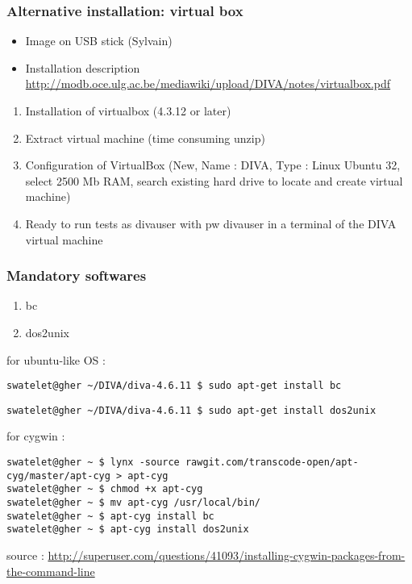 \begin{frame}
\frametitle{Alternative installation: virtual box}
\begin{itemize}
\item Image  on USB stick (Sylvain)
\item Installation description \url{http://modb.oce.ulg.ac.be/mediawiki/upload/DIVA/notes/virtualbox.pdf}
\end{itemize}

\begin{enumerate}
\item Installation of virtualbox (4.3.12 or later)
\item Extract virtual machine  (time consuming unzip)
\item Configuration of VirtualBox (New, Name : DIVA, Type : Linux Ubuntu 32, select 2500 Mb RAM, search existing hard drive to locate  and create virtual machine)
\item Ready to run tests as divauser with pw divauser in a terminal of the DIVA virtual machine
\end{enumerate}



\end{frame}
\begin{frame}[fragile]
\frametitle{Mandatory softwares}

\begin{enumerate}
\item bc
\item dos2unix
\end{enumerate}

for ubuntu-like OS :

\begin{lstlisting}[style=Bash]
swatelet@gher ~/DIVA/diva-4.6.11 $ sudo apt-get install bc
\end{lstlisting}

\begin{lstlisting}[style=Bash]
swatelet@gher ~/DIVA/diva-4.6.11 $ sudo apt-get install dos2unix
\end{lstlisting}

for cygwin :

\begin{lstlisting}[style=Bash]
swatelet@gher ~ $ lynx -source rawgit.com/transcode-open/apt-cyg/master/apt-cyg > apt-cyg
swatelet@gher ~ $ chmod +x apt-cyg
swatelet@gher ~ $ mv apt-cyg /usr/local/bin/
swatelet@gher ~ $ apt-cyg install bc
swatelet@gher ~ $ apt-cyg install dos2unix
\end{lstlisting}

source : \url{http://superuser.com/questions/41093/installing-cygwin-packages-from-the-command-line}

\end{frame}

